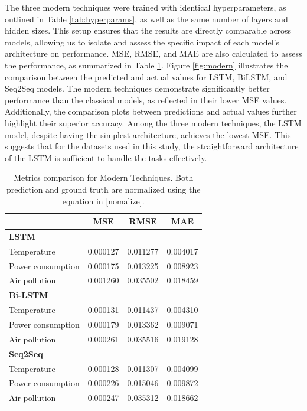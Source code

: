 \documentclass{scrartcl}
\begin{document}
The three modern techniques were trained with identical hyperparameters, as outlined in Table \ref{tab:hyperparams}, as well as the same number of layers and hidden sizes. This setup ensures that the results are directly comparable across models, allowing us to isolate and assess the specific impact of each model’s architecture on performance.  MSE, RMSE, and MAE are also calculated to assess the performance, as summarized in Table \ref{tab:lstm_metric}. Figure \ref{fig:modern} illustrates the comparison between the predicted and actual values for LSTM, BiLSTM, and Seq2Seq models. The modern techniques demonstrate significantly better performance than the classical models, as reflected in their lower MSE values. Additionally, the comparison plots between predictions and actual values further highlight their superior accuracy. Among the three modern techniques, the LSTM model, despite having the simplest architecture, achieves the lowest MSE. This suggests that for the datasets used in this study, the straightforward architecture of the LSTM is sufficient to handle the tasks effectively.

\begin{table}[h!]
\centering
\begin{tabular}{@{}lccc@{}}
\toprule
\textbf{}               & \textbf{MSE} & \textbf{RMSE} & \textbf{MAE} \\ \midrule
\textbf{LSTM}           &              &               &              \\
Temperature             & 0.000127     & 0.011277      & 0.004017     \\
Power consumption       & 0.000175     & 0.013225      & 0.008923     \\
Air pollution           & 0.001260     & 0.035502      & 0.018459     \\ \midrule
\textbf{Bi-LSTM}        &              &               &              \\
Temperature             & 0.000131     & 0.011437      & 0.004310     \\
Power consumption       & 0.000179     & 0.013362      & 0.009071     \\
Air pollution           & 0.000261     & 0.035516      & 0.019128     \\ \midrule
\textbf{Seq2Seq}        &              &               &              \\
Temperature             & 0.000128     & 0.011307      & 0.004099     \\
Power consumption       & 0.000226     & 0.015046      & 0.009872     \\
Air pollution           & 0.000247     & 0.035312      & 0.018662       \\ \bottomrule
\end{tabular}
\caption{Metrics comparison for Modern Techniques. Both prediction and ground truth are normalized using the equation in \ref{nomalize}.}
\label{tab:lstm_metric}
\end{table}
\end{document}
